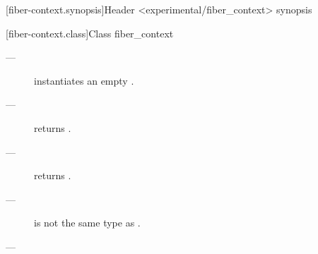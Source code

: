 
[fiber-context.synopsis]{Header <experimental/fiber\_context> synopsis}


[fiber-context.class]{Class fiber\_context}


\label{constructor}

\effects
\begin{description}
    \item[---] instantiates an empty \fiber.
\end{description}

\postcond
\begin{description}
    \item[---]  returns .
    \item[---]  returns .
\end{description}


\constraints
\begin{description}
    \item[---]  is not the same type as .
\end{description}

\mandates
\begin{description}
    \item[---] \\
\end{description}


